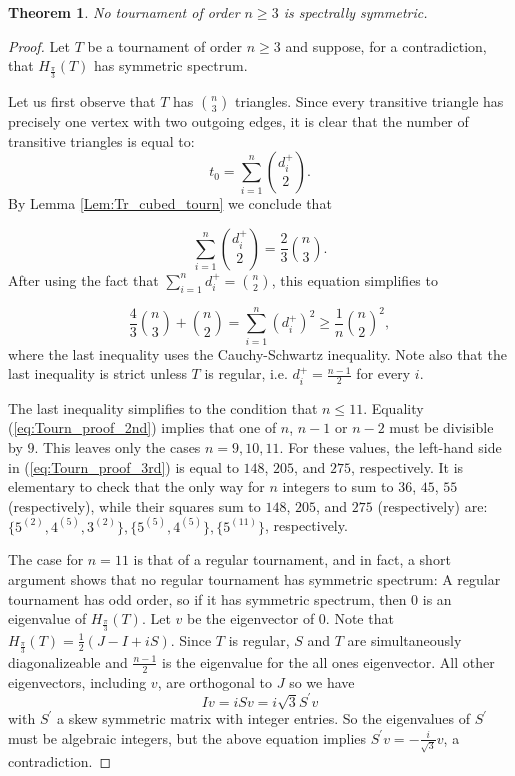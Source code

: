 \documentclass[11pt]{article}
\theoremstyle{plain}
\newtheorem{theorem}{Theorem}[section]
\newcommand{\Hs}[0]{H_{\frac{\pi}{3}}}
\newcommand{\ssymend}[0]{spectrally symmetric}
\begin{document}
\begin{theorem} \label{Thm:no_sym_tourn}
No tournament of order $n\ge 3$ is \ssymend.
\end{theorem}


\begin{proof}
Let $T$ be a tournament of order $n\ge3$ and suppose, for a
contradiction, that $\Hs(T)$ has symmetric spectrum.

Let us first observe that $T$ has $\binom{n}{3}$ triangles. Since every
transitive triangle has precisely one vertex with two outgoing edges, it
is clear that the number of transitive triangles is equal to:
\[t_0 = \sum_{i=1}^n \binom{d^+_i}{2}.\] 
By Lemma \ref{Lem:Tr_cubed_tourn} we conclude that

\begin{equation} \label{eq:Tourn_proof_2nd}
     \sum_{i=1}^n \binom{d^+_i}{2} = \frac{2}{3}\binom{n}{3}.
\end{equation}
After using the fact that $\sum_{i=1}^n d^+_i = \binom{n}{2}$, this
equation simplifies to

\begin{equation}\label{eq:Tourn_proof_3rd}\frac{4}{3}\binom{n}{3} + \binom{n}{2} = \sum_{i=1}^n (d^+_i)^2 \ge
\frac{1}{n}{\binom{n}{2}}^2,\end{equation}
where the last inequality uses the Cauchy-Schwartz inequality. Note also
that the last inequality is strict unless $T$ is regular, i.e.
$d^+_i=\frac{n-1}{2}$ for every $i$.

The last inequality simplifies to the condition that $n\le11$. Equality
(\ref{eq:Tourn_proof_2nd}) implies that one of $n$, $n-1$ or $n-2$ must be
divisible by $9$. This leaves only the cases $n=9,10,11$. For these
values, the left-hand side in (\ref{eq:Tourn_proof_3rd}) is equal to $148$, $205$, and $275$, respectively. It is elementary to check that the only way for 
$n$ integers to sum to $36$, $45$, $55$ (respectively), while their squares sum to $148$, $205$, and $275$ (respectively) are: $\{5^{(2)},4^{(5)},3^{(2)}\}, \{5^{(5)},4^{(5)}\}, \{5^{(11)}\}$, respectively.


The case for $n=11$ is that of a regular tournament, and in fact, a short argument shows that no regular tournament has symmetric spectrum: A regular tournament has odd order, so if it has symmetric spectrum, then $0$ is an eigenvalue of $\Hs(T)$. Let $v$ be the eigenvector of $0$. Note that $\Hs(T)=\frac{1}{2}(J-I+iS)$. Since $T$ is regular, $S$ and $T$ are simultaneously diagonalizeable and $\frac{n-1}{2}$ is the eigenvalue for the all ones eigenvector. All other eigenvectors, including $v$, are orthogonal to $J$ so we have \[Iv=iSv=i\sqrt{3}S^\prime v\] with $S^\prime$ a skew symmetric matrix with integer entries. So the eigenvalues of $S^\prime$ must be algebraic integers, but the above equation implies $S^\prime v=-\frac{i}{\sqrt{3}}v$, a contradiction.


\end{proof}
\end{document}
